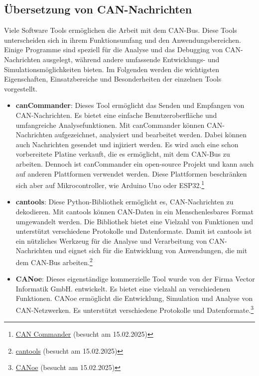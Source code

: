 \subsection{Übersetzung von CAN-Nachrichten}
Viele Software Tools ermöglichen die Arbeit mit dem CAN-Bus. Diese Tools unterscheiden sich in ihrem Funktionsumfang
und den Anwendungsbereichen.
Einige Programme sind speziell für die Analyse und das Debugging von CAN-Nachrichten 
ausgelegt, während andere umfassende Entwicklungs- und Simulationsmöglichkeiten bieten. Im Folgenden werden die wichtigsten 
Eigenschaften, Einsatzbereiche und Besonderheiten der einzelnen Tools vorgestellt. \\
\begin{itemize}
    \item \textbf{canCommander}: Dieses Tool ermöglicht das Senden und Empfangen von CAN-Nachrichten. Es bietet eine einfache 
    Benutzeroberfläche und umfangreiche Analysefunktionen. Mit canCommander können CAN-Nachrichten aufgezeichnet, 
    analysiert und bearbeitet werden. Dabei können auch Nachrichten gesendet und injiziert werden. Es wird auch eine
    schon vorbereitete Platine verkauft, die es ermöglicht, mit dem CAN-Bus zu arbeiten. Dennoch ist canCommander ein
    open-source Projekt und kann auch auf anderen Plattformen verwendet werden. Diese Plattformen beschränken sich aber
    auf Mikrocontroller, wie Arduino Uno oder 
    ESP32.\footnote{\href{https://github.com/MatthewKuKanich/CAN_Commander}{CAN Commander} (besucht am 15.02.2025)}
    \item \textbf{cantools}: Diese Python-Bibliothek ermöglicht es, CAN-Nachrichten zu dekodieren. Mit cantools können 
    CAN-Daten in ein Menschenlesbares Format umgewandelt werden. Die Bibliothek 
    bietet eine Vielzahl von Funktionen und unterstützt verschiedene Protokolle und Datenformate. Damit ist cantools ist ein 
    nützliches Werkzeug für die Analyse und Verarbeitung von CAN-Nachrichten und eignet sich für die Entwicklung von 
    Anwendungen, die mit dem CAN-Bus arbeiten.\footnote{\href{https://github.com/cantools/cantools/releases}{cantools} (besucht am 15.02.2025)}
    \item \textbf{CANoe}: Dieses eigenständige kommerzielle Tool wurde von der Firma Vector Informatik GmbH. entwickelt.
    Es bietet eine vielzahl an verschiedenen Funktionen. CANoe ermöglicht die Entwicklung, Simulation und Analyse von
    CAN-Netzwerken. Es unterstützt verschiedene Protokolle und 
    Datenformate.\footnote{\href{https://www.vector.com/de/de/produkte/produkte-a-z/software/canoe/}{CANoe} (besucht am 15.02.2025)}

\end{itemize}
